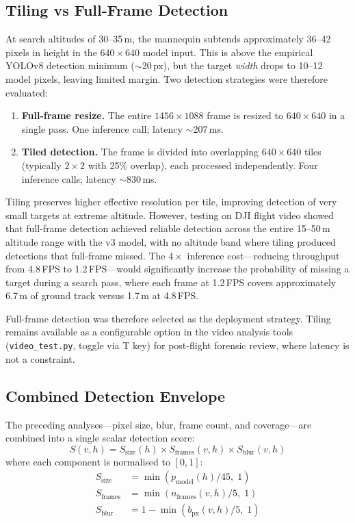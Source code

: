 \documentclass[10pt,a4paper]{article}
\begin{document}
\subsection{Tiling vs Full-Frame Detection}\label{sec:perf:tiling}

At search altitudes of 30--35\,m, the mannequin subtends approximately 36--42 pixels in height in the $640 \times 640$ model input. This is above the empirical YOLOv8 detection minimum (${\sim}$20\,px), but the target \emph{width} drops to 10--12 model pixels, leaving limited margin. Two detection strategies were therefore evaluated:

\begin{enumerate}
    \item \textbf{Full-frame resize.} The entire $1456 \times 1088$ frame is resized to $640 \times 640$ in a single pass. One inference call; latency ${\sim}$207\,ms.
    \item \textbf{Tiled detection.} The frame is divided into overlapping $640 \times 640$ tiles (typically $2 \times 2$ with 25\% overlap), each processed independently. Four inference calls; latency ${\sim}$830\,ms.
\end{enumerate}

Tiling preserves higher effective resolution per tile, improving detection of very small targets at extreme altitude. However, testing on DJI flight video showed that full-frame detection achieved reliable detection across the entire 15--50\,m altitude range with the v3 model, with no altitude band where tiling produced detections that full-frame missed. The $4\times$ inference cost---reducing throughput from 4.8\,FPS to 1.2\,FPS---would significantly increase the probability of missing a target during a search pass, where each frame at 1.2\,FPS covers approximately 6.7\,m of ground track versus 1.7\,m at 4.8\,FPS.

Full-frame detection was therefore selected as the deployment strategy. Tiling remains available as a configurable option in the video analysis tools (\texttt{video\_test.py}, toggle via T key) for post-flight forensic review, where latency is not a constraint.

\subsection{Combined Detection Envelope}\label{sec:perf:envelope}

The preceding analyses---pixel size, blur, frame count, and coverage---are combined into a single scalar detection score:
\begin{equation}\label{eq:score}
  S(v, h) = S_{\mathrm{size}}(h) \times S_{\mathrm{frames}}(v, h) \times S_{\mathrm{blur}}(v, h)
\end{equation}
where each component is normalised to $[0, 1]$:
\begin{align}
  S_{\mathrm{size}}   &= \min(p_{\mathrm{model}}(h) / 45, \; 1) \\
  S_{\mathrm{frames}} &= \min(n_{\mathrm{frames}}(v,h) / 5, \; 1) \\
  S_{\mathrm{blur}}   &= 1 - \min(b_{\mathrm{px}}(v,h) / 5, \; 1)
\end{align}
\end{document}
